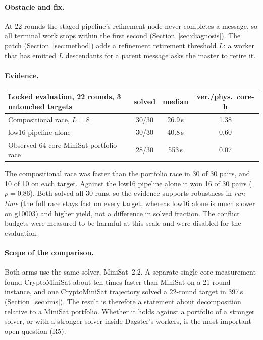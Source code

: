 \documentclass[11pt,a4paper]{article}
\begin{document}
\paragraph{Obstacle and fix.} At 22 rounds the staged pipeline's refinement node never completes a
message, so all terminal work stops within the first second (Section~\ref{sec:diagnosis}). The patch
(Section~\ref{sec:method}) adds a refinement retirement threshold $L$: a worker that has emitted $L$
descendants for a parent message asks the master to retire it.

\paragraph{Evidence.}
\begin{center}\small
\begin{tabular}{@{}lccc@{}}
\toprule
\textbf{Locked evaluation, 22 rounds, 3 untouched targets} & \textbf{solved} & \textbf{median} & \textbf{ver./phys.\ core-h}\\
\midrule
Compositional race, $L=8$ & 30/30 & 26.9\,s & 1.38\\
low16 pipeline alone & 30/30 & 40.8\,s & 0.60\\
Observed 64-core MiniSat portfolio race & 28/30 & 553\,s & 0.07\\
\bottomrule
\end{tabular}
\end{center}
The compositional race was faster than the portfolio race in 30 of 30 pairs, and 10 of 10 on each
target. Against the low16 pipeline alone it won 16 of 30 pairs ($p=0.86$). Both solved all 30 runs,
so the evidence supports robustness in \emph{run time} (the full race stays fast on every target,
whereas low16 alone is much slower on g10003) and higher yield, not a difference in solved fraction. The conflict budgets
were measured to be harmful at this scale and were disabled for the evaluation.

\paragraph{Scope of the comparison.} Both arms use the same solver, MiniSat~2.2. A separate
single-core measurement found CryptoMiniSat about ten times faster than MiniSat on a 21-round
instance, and one CryptoMiniSat trajectory solved a 22-round target in 397\,s
(Section~\ref{sec:cms}). The result is therefore a statement about decomposition relative to a
MiniSat portfolio. Whether it holds against a portfolio of a stronger solver, or with a stronger
solver inside Dagster's workers, is the most important open question (R5).
\end{document}
